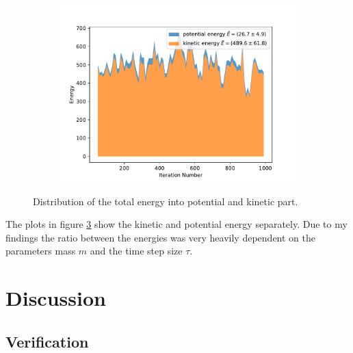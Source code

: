 \documentclass{scrartcl}
\begin{document}
\begin{figure}[H]
\begin{subfigure}[c]{0.32\textwidth}
					\label{fig:track_1000100_working_virial}
				\end{subfigure}
				\begin{subfigure}[c]{0.32\textwidth}
					\includegraphics[width=\textwidth]{../imgs/harmonic_oscillator_track/track_1000100_heavy_virial.pdf}
					\label{fig:track_1000100_heavy_virial}
				\end{subfigure}
			\caption{Distribution of the total energy into potential and kinetic part.}
			\label{fig:track_1000100_virial}
		\end{figure}
		The plots in figure \ref{fig:track_1000100_virial} show the kinetic and potential energy separately.
		Due to my findings the ratio between the energies was very heavily dependent on the parameters mass $m$ and the time step size $\tau$.

	\section{Discussion}
	\subsection{Verification}
\end{document}
